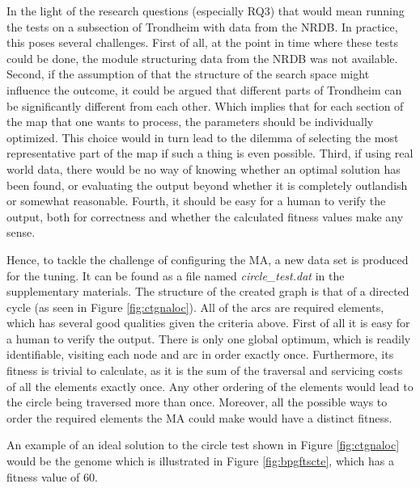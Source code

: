 In the light of the research questions (especially RQ3) that would mean running the tests on a subsection of Trondheim with data from the NRDB. In practice, this poses several challenges. First of all, at the point in time where these tests could be done, the module structuring data from the NRDB was not available. Second, if the assumption of that the structure of the search space might influence the outcome, it could be argued that different parts of Trondheim can be significantly different from each other. Which implies that for each section of the map that one wants to process, the parameters should be individually optimized. This choice would in turn lead to the dilemma of selecting the most representative part of the map if such a thing is even possible. Third, if using real world data, there would be no way of knowing whether an optimal solution has been found, or evaluating the output beyond whether it is completely outlandish or somewhat reasonable. Fourth, it should be easy for a human to verify the output, both for correctness and whether the calculated fitness values make any sense.

Hence, to tackle the challenge of configuring the MA, a new data set is produced for the tuning. It can be found as a file named \emph{circle\_test.dat} in the supplementary materials. The structure of the created graph is that of a directed cycle (as seen in Figure \ref{fig:ctgnaloc}). All of the arcs are required elements, which has several good qualities given the criteria above. First of all it is easy for a human to verify the output. There is only one global optimum, which is readily identifiable, visiting each node and arc in order exactly once. Furthermore, its fitness is trivial to calculate, as it is the sum of the traversal and servicing costs of all the elements exactly once. Any other ordering of the elements would lead to the circle being traversed more than once. Moreover, all the possible ways to order the required elements the MA could make would have a distinct fitness.

An example of an ideal solution to the circle test shown in Figure \ref{fig:ctgnaloc} would be the genome which is illustrated in Figure \ref{fig:bpgftscte}, which has a fitness value of 60.

